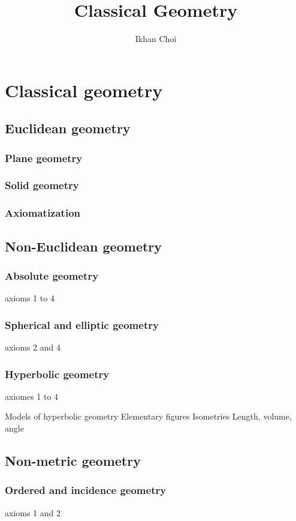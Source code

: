 \documentclass{../../large}
\begin{document}
\title{Classical Geometry}
\author{Ikhan Choi}
\maketitle
\tableofcontents

\part{Classical geometry}
\chapter{Euclidean geometry}

\section{Plane geometry}
\section{Solid geometry}
\section{Axiomatization}

\chapter{Non-Euclidean geometry}
\section{Absolute geometry}
axioms 1 to 4
\section{Spherical and elliptic geometry}
axioms 2 and 4
\section{Hyperbolic geometry}
axiomes 1 to 4

Models of hyperbolic geometry
Elementary figures
Isometries
Length, volume, angle

\chapter{Non-metric geometry}
\section{Ordered and incidence geometry}
axioms 1 and 2
\end{document}
